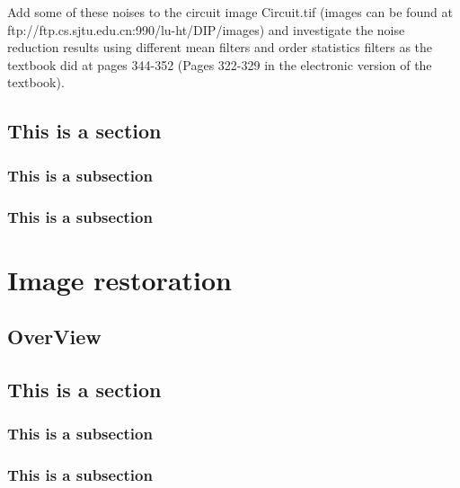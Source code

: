 \documentclass[11pt,oneside]{book}
\begin{document}
Add some of these noises to the circuit image Circuit.tif (images can be found at ftp://ftp.cs.sjtu.edu.cn:990/lu-ht/DIP/images) and investigate the noise reduction results using different mean filters and order statistics filters as the textbook did at pages 344-352 (Pages 322-329 in the electronic version of the textbook).

\section{This is a section}
\subsection{This is a subsection}
\lipsum[1-1]
\subsection{This is a subsection}
\lipsum[1-2]

\chapter{Image restoration}
\section{OverView}


\section{This is a section}
\subsection{This is a subsection}
\lipsum[1-1]
\subsection{This is a subsection}
\lipsum[1-2]
\end{document}
